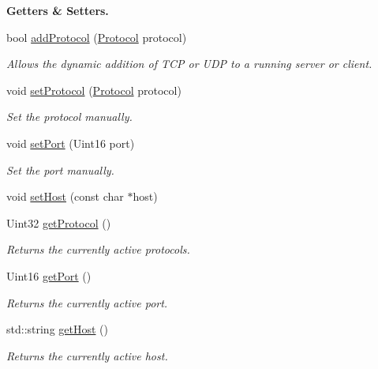 \begin{Indent}{\bf Getters \& Setters.}\par
\begin{DoxyCompactItemize}
\item 
bool \hyperlink{classNetManager_a444e45de6f806c4c27d7f9915f898329}{add\-Protocol} (\hyperlink{NetManager_8h_a9af285d1232beed01f31aac5d3a5469f}{Protocol} protocol)
\begin{DoxyCompactList}\small\item\em Allows the dynamic addition of T\-C\-P or U\-D\-P to a running server or client. \end{DoxyCompactList}\item 
void \hyperlink{classNetManager_af370ee8343ff23121c0c2f180c34dabc}{set\-Protocol} (\hyperlink{NetManager_8h_a9af285d1232beed01f31aac5d3a5469f}{Protocol} protocol)
\begin{DoxyCompactList}\small\item\em Set the protocol manually. \end{DoxyCompactList}\item 
void \hyperlink{classNetManager_af5db4e28511390202b17f6d711f42d83}{set\-Port} (Uint16 port)
\begin{DoxyCompactList}\small\item\em Set the port manually. \end{DoxyCompactList}\item 
void \hyperlink{classNetManager_a47666370887fee3b2fa27ae7bff1065f}{set\-Host} (const char $\ast$host)
\item 
Uint32 \hyperlink{classNetManager_a3c941b21b356a166f2ebbdd522dc792d}{get\-Protocol} ()
\begin{DoxyCompactList}\small\item\em Returns the currently active protocols. \end{DoxyCompactList}\item 
Uint16 \hyperlink{classNetManager_aa6924b10800963247c025870b1116a62}{get\-Port} ()
\begin{DoxyCompactList}\small\item\em Returns the currently active port. \end{DoxyCompactList}\item 
std\-::string \hyperlink{classNetManager_abe7cce0db370157b36d4e16a903a0581}{get\-Host} ()
\begin{DoxyCompactList}\small\item\em Returns the currently active host. \end{DoxyCompactList}\item 

\end{DoxyCompactItemize}
\end{Indent}
